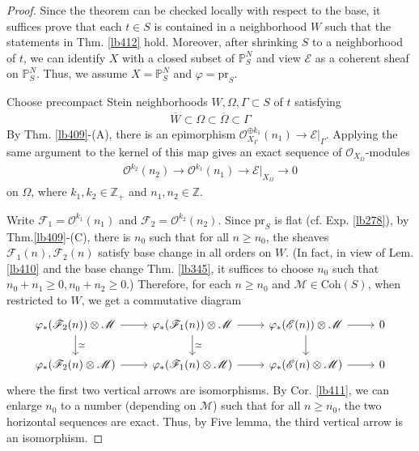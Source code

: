\documentclass[12pt,b5paper,notitlepage]{report}
\theoremstyle{definition}
\theoremstyle{plain}
\newcommand{\ovl}{\overline}
\newcommand{\scr}{\mathscr}
\newcommand{\Zbb}{\mathbb Z}
\newcommand{\Pbb}{\mathbb P}
\newcommand{\pr}{\mathrm {pr}}
\newcommand{\Coh}{\mathrm{Coh}}
\numberwithin{equation}{section}
\begin{document}
\begin{proof}
Since the theorem can be checked locally with respect to the base, it suffices prove that each $t\in S$ is contained in a neighborhood $W$ such that the statements in Thm. \ref{lb412} hold. Moreover, after shrinking $S$ to a neighborhood of $t$, we can identify $X$ with a closed subset of $\Pbb^N_S$ and view $\scr E$ as a coherent sheaf on $\Pbb^N_S$. Thus, we assume $X=\Pbb^N_S$ and $\varphi=\pr_S$.

Choose precompact Stein neighborhoods  $W,\Omega,\Gamma\subset S$ of $t$ satisfying
\begin{align*}
\ovl W\subset\Omega\subset\ovl \Omega\subset\Gamma
\end{align*}
By Thm. \ref{lb409}-(A), there is an epimorphism $\scr O_{X_\Gamma}^{\oplus k_1}(n_1)\rightarrow \scr E|_{\Gamma}$. Applying the same argument to the kernel of this map gives  an exact sequence of $\scr O_{X_\Omega}$-modules
\begin{align}
\scr O^{k_2}(n_2)\rightarrow\scr O^{k_1}(n_1)\rightarrow\scr E|_{X_\Omega}\rightarrow 0
\end{align}
on $\Omega$, where $k_1,k_2\in\Zbb_+$ and $n_1,n_2\in\Zbb$. 

Write $\scr F_1=\scr O^{k_1}(n_1)$ and $\scr F_2=\scr O^{k_2}(n_2)$. Since $\pr_S$ is flat (cf. Exp. \ref{lb278}), by Thm.\ref{lb409}-(C), there is $n_0$ such that for all $n\geq n_0$, the sheaves $\scr F_1(n),\scr F_2(n)$ satisfy base change in all orders on $W$. (In fact, in view of Lem. \ref{lb410} and the base change Thm. \ref{lb345}, it suffices to choose $n_0$ such that $n_0+n_1\geq0,n_0+n_2\geq0$.) Therefore,  for each $n\geq n_0$ and $\scr M\in\Coh(S)$, when restricted to $W$, we get a commutative diagram
\begin{equation*}
\begin{tikzcd}
\varphi_*(\scr F_2(n))\otimes\scr M \arrow[r] \arrow[d,"\simeq"] & \varphi_*(\scr F_1(n))\otimes\scr M \arrow[r] \arrow[d,"\simeq"] & \varphi_*(\scr E(n))\otimes\scr M  \arrow[d] \arrow[r] & 0  \\
\varphi_*(\scr F_2(n)\otimes\scr M) \arrow[r]           & \varphi_*(\scr F_1(n)\otimes\scr M) \arrow[r]           & \varphi_*(\scr E(n)\otimes\scr M)         \arrow[r] & 0
\end{tikzcd}
\end{equation*}
where the first two vertical arrows are isomorphisms. By Cor. \ref{lb411}, we can enlarge $n_0$ to a number (depending on $\scr M$) such that for all $n\geq n_0$, the two horizontal sequences are exact. Thus, by Five lemma, the third vertical arrow is an isomorphism.
\end{proof}
\end{document}
